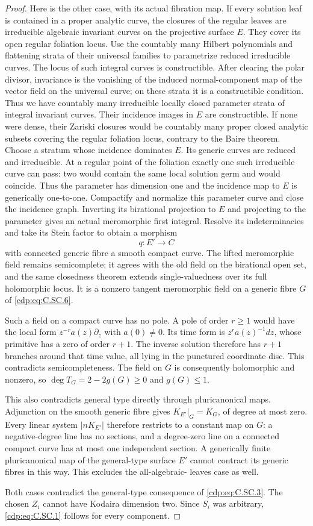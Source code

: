 \begin{proof}
Here is the other case, with its actual
fibration map. If every solution leaf is
contained in a proper analytic curve,
the closures of the regular leaves are
irreducible algebraic invariant curves
on the projective surface $E$. They
cover its open regular foliation locus.
Use the countably many Hilbert polynomials
and flattening strata of their universal
families to parametrize reduced irreducible
curves. The locus of such integral curves
is constructible. After clearing the
polar divisor, invariance is the vanishing
of the induced normal-component map of
the vector field on the universal curve;
on these strata it is a constructible
condition. Thus we have countably many
irreducible locally closed parameter
strata of integral invariant curves.
Their incidence images in $E$ are
constructible. If none were dense, their
Zariski closures would be countably many
proper closed analytic subsets covering
the regular foliation locus, contrary
to the Baire theorem. Choose a stratum
whose incidence dominates $E$. Its
generic curves are reduced and
irreducible. At a regular point of the
foliation exactly one such irreducible
curve can pass: two would contain the
same local solution germ and would
coincide. Thus the parameter has dimension
one and the incidence map to $E$ is
generically one-to-one. Compactify and
normalize this parameter curve and
close the incidence graph. Inverting
its birational projection to $E$ and
projecting to the parameter gives an
actual meromorphic first integral.
Resolve its indeterminacies and take its
Stein factor to obtain a morphism
\[
                         q:E'\longrightarrow C
 \tag{C.SC.6}\label{cdp:eq:C.SC.6}
\]
with connected generic fibre a smooth
compact curve. The lifted meromorphic
field remains semicomplete: it agrees
with the old field on the birational
open set, and the same closedness theorem
extends single-valuedness over its full
holomorphic locus. It is a nonzero
tangent meromorphic field on a generic
fibre $G$ of \eqref{cdp:eq:C.SC.6}.

Such a field on a compact curve has no
pole. A pole of order $r\ge1$ would
have the local form $z^{-r}a(z)\partial_z$
with $a(0)\ne0$. Its time form is
$z^r a(z)^{-1}dz$, whose primitive has
a zero of order $r+1$. The inverse
solution therefore has $r+1$ branches
around that time value, all lying in
the punctured coordinate disc. This
contradicts semicompleteness. The field
on $G$ is consequently holomorphic
and nonzero, so
$\deg T_G=2-2g(G)\ge0$ and $g(G)\le1$.

This also contradicts general type
directly through pluricanonical maps.
Adjunction on the smooth generic fibre
gives $K_{E'}|_G=K_G$, of degree at
most zero. Every linear system
$|nK_{E'}|$ therefore restricts to a
constant map on $G$: a negative-degree
line has no sections, and a degree-zero
line on a connected compact curve has
at most one independent section. A
generically finite pluricanonical map
of the general-type surface $E'$ cannot
contract its generic fibres in this
way. This excludes the all-algebraic-
leaves case as well.

Both cases contradict the general-type
consequence of \eqref{cdp:eq:C.SC.3}. The chosen
$Z_i$ cannot have Kodaira dimension
two. Since $S_i$ was arbitrary,
\eqref{cdp:eq:C.SC.1} follows for every component.
\end{proof}



